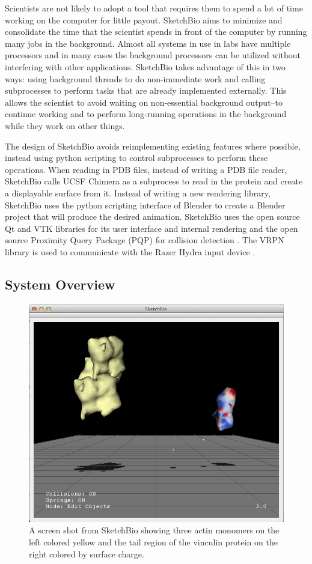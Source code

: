 \documentclass[twocolumn]{bmcart}%
\begin{document}
Scientists are not likely to adopt a tool that requires them to spend a lot of time working on the computer for little payout.  SketchBio aims to minimize and consolidate the time that the scientist spends in front of the computer by running many jobs in the background.  Almost all systems in use in labs have multiple processors and in many cases the background processors can be utilized without interfering with other applications.  SketchBio takes advantage of this in two ways: using background threads to do non-immediate work and calling subprocesses to perform tasks that are already implemented externally.  This allows the scientist to avoid waiting on non-essential background output--to continue working and to perform long-running operations in the background while they work on other things.

The design of SketchBio avoids reimplementing existing features where possible, instead using python scripting to control subprocesses to perform these operations.  When reading in PDB files, instead of writing a PDB file reader, SketchBio calls UCSF Chimera as a subprocess to read in the protein and create a displayable surface from it.  Instead of writing a new rendering library, SketchBio uses the python scripting interface of Blender to create a Blender project that will produce the desired animation.  SketchBio uses the open source Qt and VTK\cite{VTKbook} libraries for its user interface and internal rendering and the open source Proximity Query Package (PQP) for collision detection \cite{PQP}.  The VRPN library is used to communicate with the Razer Hydra input device \cite{taylor2001vrpn}.

\subsection*{System Overview}

\begin{figure}[t]
\centering
\includegraphics[width=0.8\columnwidth]{actinVinculin.png}
\caption{A screen shot from SketchBio showing three actin monomers on the left colored yellow and the tail region of the vinculin protein on the right colored by surface charge.}
\label{fig:actin_vinculin}
\end{figure}
\end{document}
